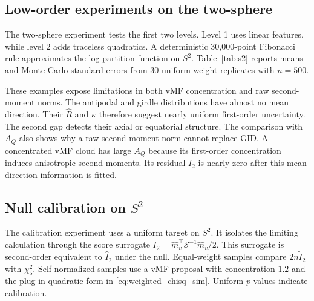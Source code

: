 \documentclass[twoside]{article}
\theoremstyle{definition}
\theoremstyle{remark}
\newcommand{\norm}[1]{\left\lVert #1\right\rVert}
\begin{document}
\subsection{Low-order experiments on the two-sphere}

The two-sphere experiment tests the first two levels. Level 1 uses linear features, while level 2 adds traceless quadratics. A deterministic 30,000-point Fibonacci rule approximates the log-partition function on $S^2$. Table~\ref{tab:s2} reports means and Monte Carlo standard errors from 30 uniform-weight replicates with $n=500$.

\begin{table}[ht]
\centering
\caption{Low-order information gaps and classical summaries on $S^2$. Here, $A_Q=\norm{\sum_iw_ix_ix_i^\top-I_3/3}_F$.}
\label{tab:s2}
\scriptsize
{}
\end{table}


These examples expose limitations in both vMF concentration and raw second-moment norms. The antipodal and girdle distributions have almost no mean direction. Their $\widehat R$ and $\widehat\kappa$ therefore suggest nearly uniform first-order uncertainty. The second gap detects their axial or equatorial structure. The comparison with $A_Q$ also shows why a raw second-moment norm cannot replace GID. A concentrated vMF cloud has large $A_Q$ because its first-order concentration induces anisotropic second moments. Its residual $I_2$ is nearly zero after this mean-direction information is fitted.


\subsection[Null calibration on S2]{Null calibration on $S^2$}

The calibration experiment uses a uniform target on $S^2$. It isolates the limiting calculation through the score surrogate $\widetilde I_2=\widehat m_v^\top\mathcal S^{-1}\widehat m_v/2$. This surrogate is second-order equivalent to $\widehat I_2$ under the null. Equal-weight samples compare $2n\widetilde I_2$ with $\chi^2_5$. Self-normalized samples use a vMF proposal with concentration $1.2$ and the plug-in quadratic form in \eqref{eq:weighted_chisq_sim}. Uniform $p$-values indicate calibration.
\end{document}
